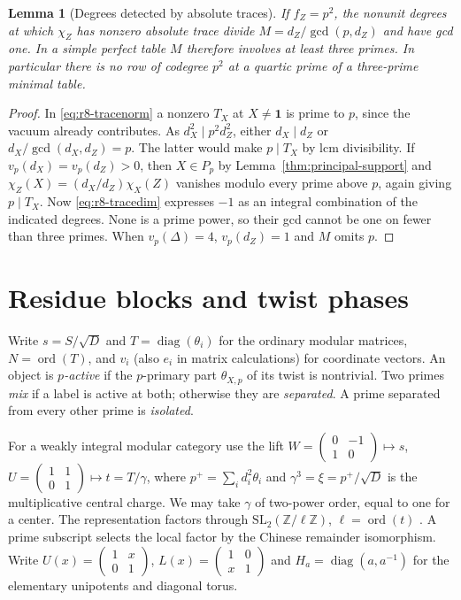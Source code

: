 \documentclass[11pt,a4paper]{article}
\numberwithin{equation}{section}
\newtheorem{lemma}[theorem]{Lemma}
\theoremstyle{remark}
\newcommand{\one}{\mathbf1}
\DeclareMathOperator{\ord}{ord}
\begin{document}
\begin{lemma}[Degrees detected by absolute traces]\label{prop:quartic-prime-top-codegree}
If $f_Z=p^2$, the nonunit degrees at which $\chi_Z$ has nonzero absolute trace divide $M=d_Z/\gcd(p,d_Z)$ and have gcd one. In a simple perfect table $M$ therefore involves at least three primes. In particular there is no row of codegree $p^2$ at a quartic prime of a three-prime minimal table.
\end{lemma}\begin{proof}
In \eqref{eq:r8-tracenorm} a nonzero $T_X$ at $X\ne\one$ is prime to $p$, since the vacuum already contributes. As $d_X^2\mid p^2d_Z^2$, either $d_X\mid d_Z$ or $d_X/\gcd(d_X,d_Z)=p$. The latter would make $p\mid T_X$ by lcm divisibility. If $v_p(d_X)=v_p(d_Z)>0$, then $X\in P_p$ by Lemma~\ref{thm:principal-support} and $\chi_Z(X)=(d_X/d_Z)\chi_X(Z)$ vanishes modulo every prime above $p$, again giving $p\mid T_X$.
Now \eqref{eq:r8-tracedim} expresses $-1$ as an integral combination of the indicated degrees. None is a prime power, so their gcd cannot be one on fewer than three primes. When $v_p(\Delta)=4$, $v_p(d_Z)=1$ and $M$ omits $p$.
\end{proof}

\section{Residue blocks and twist phases}
Write $s=S/\sqrt D$ and $T=\operatorname{diag}(\theta_i)$ for the ordinary modular matrices, $N=\ord(T)$, and $v_i$ (also $e_i$ in matrix calculations) for coordinate vectors. An object is \emph{$p$-active} if the $p$-primary part $\theta_{X,p}$ of its twist is nontrivial. Two primes \emph{mix} if a label is active at both; otherwise they are \emph{separated}. A prime separated from every other prime is \emph{isolated}.

For a weakly integral modular category use the lift
$W=\left(\begin{smallmatrix}0&-1\\1&0\end{smallmatrix}\right)\mapsto s$,
$U=\left(\begin{smallmatrix}1&1\\0&1\end{smallmatrix}\right)\mapsto t=T/\gamma$,
where $p^+=\sum_i d_i^2\theta_i$ and $\gamma^3=\xi=p^+/\sqrt D$ is the multiplicative central charge. We may take $\gamma$ of two-power order, equal to one for a center. The representation factors through $\mathrm{SL}_2(\mathbb Z/\ell\mathbb Z)$, $\ell=\ord(t)$ \cite[(1-10), Theorem~II(i), Proposition~6.7(ii) and Theorem~6.10]{DLNCongruence}. A prime subscript selects the local factor by the Chinese remainder isomorphism. Write $U(x)=\left(\begin{smallmatrix}1&x\\0&1\end{smallmatrix}\right)$, $L(x)=\left(\begin{smallmatrix}1&0\\x&1\end{smallmatrix}\right)$ and $H_a=\operatorname{diag}(a,a^{-1})$ for the elementary unipotents and diagonal torus.
\end{document}
